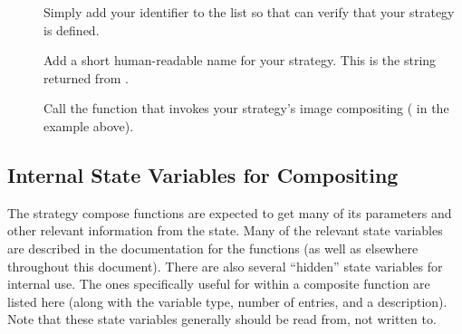 \begin{description}
\item[] Simply add your
  identifier to the list so that \IceT can verify that your strategy is
  defined.
\item[] Add a short
  human-readable name for your strategy.  This is the string returned from
  .
\item[] Call the function that
  invokes your strategy's image compositing
  ( in the example above).
\end{description}

\subsection{Internal State Variables for Compositing}

The strategy compose functions are expected to get many of its parameters
and other relevant information from the \IceT state.  Many of the relevant
state variables are described in the documentation for the 
functions (as well as elsewhere throughout this document).  There are also
several ``hidden'' state variables for internal use.  The ones specifically
useful for within a composite function are listed here (along with the
variable type, number of entries, and a description).  Note that these
state variables generally should be read from, not written to.

